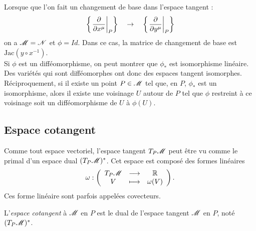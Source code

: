 \documentclass[a4paper,11pt]{report}
\begin{document}
                Lorsque que l'on fait un changement de base dans l'espace tangent : 
                \begin{equation*}
                    \left\{\eval{\pdv{}{x^\mu}}_{P}\right\}\quad\to\quad \left\{\eval{\pdv{}{y^\mu}}_P\right\}
                \end{equation*}
                on a $\mathscr{M}=\mathscr{N}$ et $\phi = Id$. Dans ce cas, la matrice de changement de base est $\text{Jac}(y\circ x^{-1})$.\\
                
                Si $\phi$ est un difféomorphisme, on peut montrer que $\phi_*$ est isomorphisme linéaire. Des variétés qui sont difféomorphes ont donc des espaces tangent isomorphes. Réciproquement, si il existe un point $P\in\mathscr{M}$ tel que, en $P$, $\phi_*$ est un isomorphisme, alors il existe une voisinage $U$ autour de $P$ tel que $\phi$ restreint à ce voisinage soit un difféomorphisme de $U$ à $\phi(U)$.
                
                
            
            \subsection{Espace cotangent}
            
                Comme tout espace vectoriel, l'espace tangent $T_P\mathscr{M}$ peut être vu comme le primal d'un espace dual $(T_P\mathscr{M})^*$. Cet espace est composé des formes linéaires
                \begin{equation}
                    \omega:\left(
                \begin{array}{ccc}
                    T_P\mathscr{M} & \longrightarrow & \mathbb{R} \\
                    V & \longmapsto & \omega(V)
                \end{array}
                \right).
                \end{equation}
                Ces forme linéaire sont parfois appelées covecteurs.
                
                \begin{definition}
                    L'\textit{espace cotangent} à $\mathscr{M}$ en $P$ est le dual de l'espace tangent $\mathscr{M}$ en $P$, noté $(T_P\mathscr{M})^*$.
                \end{definition}
                
\end{document}

